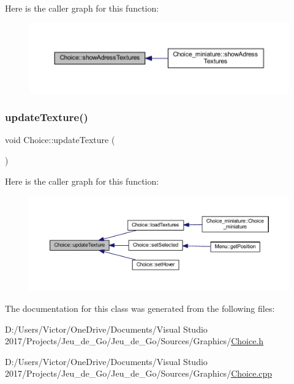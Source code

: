 Here is the caller graph for this function\+:
\nopagebreak
\begin{figure}[H]
\begin{center}
\leavevmode
\includegraphics[width=350pt]{class_choice_ad29163ceee43a59dba6ea46452ca46c0_icgraph}
\end{center}
\end{figure}
\mbox{\label{class_choice_aa3113d895017610a03fff73795cf22fd}} 
\subsubsection{\texorpdfstring{update\+Texture()}{updateTexture()}}
{\footnotesize\ttfamily void Choice\+::update\+Texture (\begin{DoxyParamCaption}{ }\end{DoxyParamCaption})}

Here is the caller graph for this function\+:
\nopagebreak
\begin{figure}[H]
\begin{center}
\leavevmode
\includegraphics[width=350pt]{class_choice_aa3113d895017610a03fff73795cf22fd_icgraph}
\end{center}
\end{figure}


The documentation for this class was generated from the following files\+:\begin{DoxyCompactItemize}
\item 
D\+:/\+Users/\+Victor/\+One\+Drive/\+Documents/\+Visual Studio 2017/\+Projects/\+Jeu\+\_\+de\+\_\+\+Go/\+Jeu\+\_\+de\+\_\+\+Go/\+Sources/\+Graphics/\hyperlink{_choice_8h}{Choice.\+h}\item 
D\+:/\+Users/\+Victor/\+One\+Drive/\+Documents/\+Visual Studio 2017/\+Projects/\+Jeu\+\_\+de\+\_\+\+Go/\+Jeu\+\_\+de\+\_\+\+Go/\+Sources/\+Graphics/\hyperlink{_choice_8cpp}{Choice.\+cpp}\end{DoxyCompactItemize}
